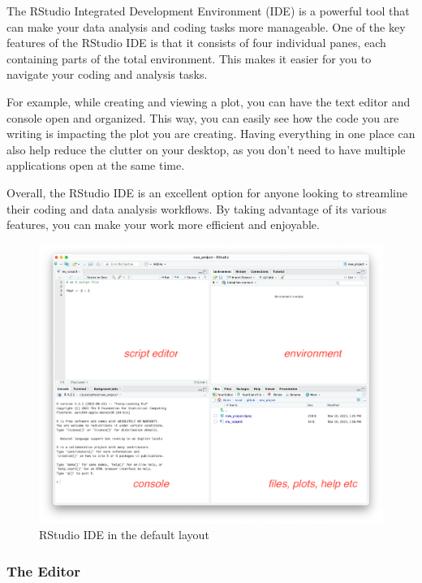 \documentclass[
]{book}
\begin{document}
The RStudio Integrated Development Environment (IDE) is a powerful tool that can make your data analysis and coding tasks more manageable. One of the key features of the RStudio IDE is that it consists of four individual panes, each containing parts of the total environment. This makes it easier for you to navigate your coding and analysis tasks.

For example, while creating and viewing a plot, you can have the text editor and console open and organized. This way, you can easily see how the code you are writing is impacting the plot you are creating. Having everything in one place can also help reduce the clutter on your desktop, as you don't need to have multiple applications open at the same time.

Overall, the RStudio IDE is an excellent option for anyone looking to streamline their coding and data analysis workflows. By taking advantage of its various features, you can make your work more efficient and enjoyable.

\begin{figure}
\includegraphics[width=19.19in]{images/02_021_rstudio_panes} \caption{\label{fig:2021}RStudio IDE in the default layout}\label{fig:2021}
\end{figure}

\hypertarget{the-editor}{%
\subsubsection*{The Editor}\label{the-editor}}
\end{document}
